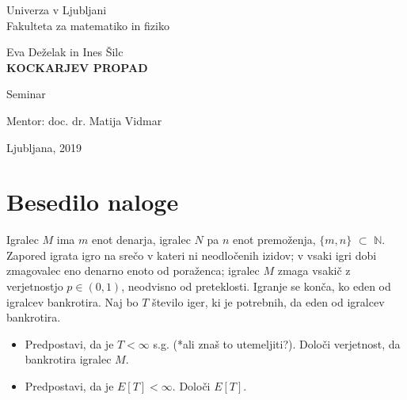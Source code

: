 \documentclass[12pt, a4paper]{article}
\begin{document}
\begin{titlepage}
\begin{center}

\large
Univerza v Ljubljani\\
\normalsize
Fakulteta za matematiko in fiziko\\

\vspace{3 cm} 

\large
Eva Deželak in Ines Šilc\\

\vspace{0.5cm}
\LARGE
\textbf{KOCKARJEV PROPAD}

\vspace{0.5 cm}
\normalsize
Seminar

\vspace{1.5cm}
\normalsize
Mentor: doc. dr. Matija Vidmar

\vspace{3cm}


\vfill

\large Ljubljana, 2019

\end{center}
\end{titlepage}

\newpage

\tableofcontents

\newpage

 \section[Besedilo naloge]{Besedilo naloge}


\begin{flushleft}
Igralec $M$ ima $m$ enot denarja, igralec $N$ pa $n$ enot premoženja, $\{m, n\}$ $\subset$ $\mathbb{N}$. Zapored igrata igro na srečo v kateri ni neodločenih izidov; v vsaki igri dobi zmagovalec eno denarno enoto od poraženca; igralec $M$ zmaga vsakič z verjetnostjo $p \in (0, 1)$, neodvisno od preteklosti. Igranje se konča, ko eden od igralcev bankrotira. Naj bo $T$ število iger, ki je potrebnih, da eden od igralcev bankrotira.

\begin{itemize}
    \item Predpostavi, da je $T < \infty$ s.g. (*ali znaš to utemeljiti?). Določi verjetnost, da bankrotira igralec $M$.
    \item Predpostavi, da je $E[T] < \infty$. Določi $E[T]$.
\end{itemize}
\end{flushleft}
\end{document}
